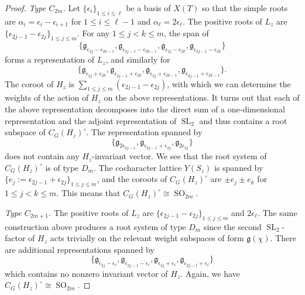 \documentclass[11pt,oneside,dvipsnames]{amsart}
\theoremstyle{plain}
\theoremstyle{definition}
\theoremstyle{named}
\DeclareMathOperator{\SL}{SL}
\DeclareMathOperator{\SO}{SO}
\begin{document}
\begin{proof}
\textit{Type $C_{2m}$.} Let $\{\epsilon_i\}_{1\le i\le \ell}$ be a basis of $X(T)$ so that the simple roots are $\alpha_i=\epsilon_i-\epsilon_{i+1}$ for $1\le i\le \ell-1$ and $\alpha_{\ell}=2\epsilon_{\ell}$. The positive roots of $L_z$ are $\{\epsilon_{2j-1}-\epsilon_{2j}\}_{1\le j\le m}$. For any $1\le j<k\le m$, the span of 
$$
\{\mathfrak{g}_{\epsilon_{2j}-\epsilon_{2k-1}},\mathfrak{g}_{\epsilon_{2j-1}-\epsilon_{2k-1}},\mathfrak{g}_{\epsilon_{2j}-\epsilon_{2k}},\mathfrak{g}_{\epsilon_{2j-1}-\epsilon_{2k}}\}
$$
forms a representation of $L_z$, and similarly for
$$
\{\mathfrak{g}_{\epsilon_{2j}+\epsilon_{2k}},\mathfrak{g}_{\epsilon_{2j-1}+\epsilon_{2k}},\mathfrak{g}_{\epsilon_{2j}+\epsilon_{2k-1}},\mathfrak{g}_{\epsilon_{2j-1}+\epsilon_{2k-1}}\}.
$$
The coroot of $H_z$ is $\sum_{1\le j\le m}(\epsilon_{2j-1}-\epsilon_{2j})$, with which we can determine the weights of the action of $H_z$ on the above representations. It turns out that each of the above representation decomposes into the direct sum of a one-dimensional representation and the adjoint representation of $\SL_2$ and thus contains a root subspace of $C_G(H_z)^{\circ}$. The representation spanned by 
$$
\{\mathfrak{g}_{2\epsilon_{2j-1}},\mathfrak{g}_{\epsilon_{2j-1}+\epsilon_{2j}},\mathfrak{g}_{2\epsilon_{2j}}\}
$$
does not contain any $H_z$-invariant vector. We see that the root system of $C_G(H_z)^{\circ}$ is of type $D_{m}$. The cocharacter lattice $Y(S_z)$ is spanned by $\{e_j:=\epsilon_{2j-1}+\epsilon_{2j}\}_{1\le j\le m}$, and the coroots of $C_G(H_z)^{\circ}$ are $\pm e_j\pm e_k$ for $1\le j<k\le m$. This means that $C_G(H_z)^{\circ}\cong\SO_{2m}$.

\textit{Type $C_{2m+1}$.} The positive roots of $L_z$ are $\{\epsilon_{2j-1}-\epsilon_{2j}\}_{1\le j\le m}$ and $2\epsilon_{\ell}$. The same construction above produces a root system of type $D_m$ since the second $\SL_2$-factor of $H_z$ acts trivially on the relevant weight subspaces of form $\mathfrak{g}(\chi)$. There are additional representations spanned by $$
\{\mathfrak{g}_{\epsilon_{2j}-\epsilon_{\ell}},\mathfrak{g}_{\epsilon_{2j-1}-\epsilon_{\ell}},\mathfrak{g}_{\epsilon_{2j}+\epsilon_{\ell}},\mathfrak{g}_{\epsilon_{2j-1}+\epsilon_{\ell}}\}
$$
which contains no nonzero invariant vector of $H_z$. Again, we have $C_G(H_z)^{\circ}\cong\SO_{2m}$.


\end{proof}
\end{document}

